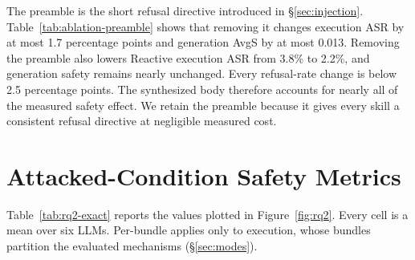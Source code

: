 The preamble is the short refusal directive introduced in \S\ref{sec:injection}. Table~\ref{tab:ablation-preamble} shows that removing it changes execution ASR by at most 1.7 percentage points and generation AvgS by at most 0.013. Removing the preamble also lowers Reactive execution ASR from 3.8\% to 2.2\%, and generation safety remains nearly unchanged. Every refusal-rate change is below 2.5 percentage points. The synthesized body therefore accounts for nearly all of the measured safety effect. We retain the preamble because it gives every skill a consistent refusal directive at negligible measured cost.


\section{Attacked-Condition Safety Metrics}
\label{app:rq2-exact}

Table~\ref{tab:rq2-exact} reports the values plotted in Figure~\ref{fig:rq2}. Every cell is a mean over six LLMs. Per-bundle applies only to execution, whose bundles partition the evaluated mechanisms (\S\ref{sec:modes}).

